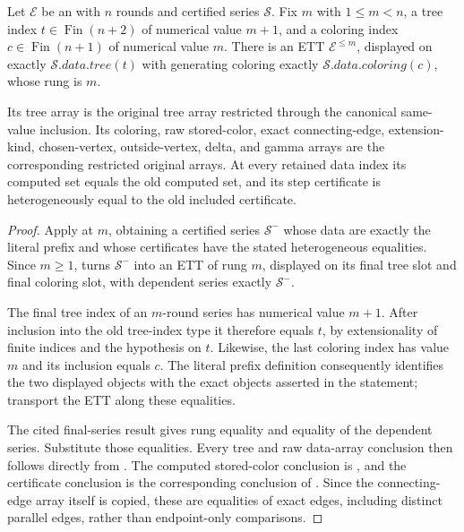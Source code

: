 \begin{lemma}
Let \(\mathcal E\) be an  with \(n\) rounds and
certified series \(\mathcal S\).  Fix \(m\) with \(1\leq m<n\), a tree index
\(t\in\operatorname{Fin}(n+2)\) of numerical value \(m+1\), and a coloring
index \(c\in\operatorname{Fin}(n+1)\) of numerical value \(m\).  There is an
ETT \(\mathcal E^{\leq m}\), displayed on exactly
\(\mathcal S.\mathit{data}.\mathit{tree}(t)\) with generating coloring exactly
\(\mathcal S.\mathit{data}.\mathit{coloring}(c)\), whose rung is \(m\).

Its tree array is the original tree array restricted through the canonical
same-value inclusion.  Its coloring, raw stored-color, exact connecting-edge,
extension-kind, chosen-vertex, outside-vertex, delta, and gamma arrays are the
corresponding restricted original arrays.  At every retained data index its
computed  set equals the old computed set, and
its step certificate is heterogeneously equal to the old included certificate.
\end{lemma}
\begin{proof}
Apply  at \(m\), obtaining a certified series
\(\mathcal S^-\) whose data are exactly the literal prefix and whose
certificates have the stated heterogeneous equalities.  Since \(m\geq1\),
 turns \(\mathcal S^-\) into an ETT of
rung \(m\), displayed on its final tree slot and final coloring slot, with
dependent series exactly \(\mathcal S^-\).

The final tree index of an \(m\)-round series has numerical value \(m+1\).
After inclusion into the old tree-index type it therefore equals \(t\), by
extensionality of finite indices and the hypothesis on \(t\).  Likewise, the
last coloring index has value \(m\) and its inclusion equals \(c\).  The
literal prefix definition consequently identifies the two displayed objects
with the exact objects asserted in the statement; transport the ETT along
these equalities.

The cited final-series result gives rung equality and equality of the dependent
series.  Substitute those equalities.  Every tree and raw data-array conclusion
then follows directly from .  The computed
stored-color conclusion is , and the
certificate conclusion is the corresponding conclusion of
.  Since the connecting-edge array itself is
copied, these are equalities of exact edges, including distinct parallel
edges, rather than endpoint-only comparisons.
\end{proof}

